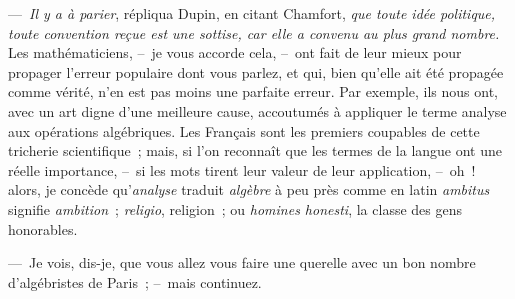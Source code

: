 \documentclass[french,twoside]{book} %
\begin{document}
— \emph{Il y a à parier}, répliqua Dupin, en citant Chamfort, \emph{que toute idée politique, toute convention reçue est une sottise, car elle a convenu au plus grand nombre.} Les mathématiciens, – je vous accorde cela, – ont fait de leur mieux pour propager l’erreur populaire dont vous parlez, et qui, bien qu’elle ait été propagée comme vérité, n’en est pas moins une parfaite erreur. Par exemple, ils nous ont, avec un art digne d’une meilleure cause, accoutumés à appliquer le terme analyse aux opérations algébriques. Les Français sont les premiers coupables de cette tricherie scientifique ; mais, si l’on reconnaît que les termes de la langue ont une réelle importance, – si les mots tirent leur valeur de leur application, – oh ! alors, je concède qu’\emph{analyse} traduit \emph{algèbre} à peu près comme en latin \emph{ambitus} signifie\emph{ ambition} ; \emph{religio}, religion ; ou\emph{ homines honesti}, la classe des gens honorables.\par
— Je vois, dis-je, que vous allez vous faire une querelle avec un bon nombre d’algébristes de Paris ; – mais continuez.\par
\end{document}
